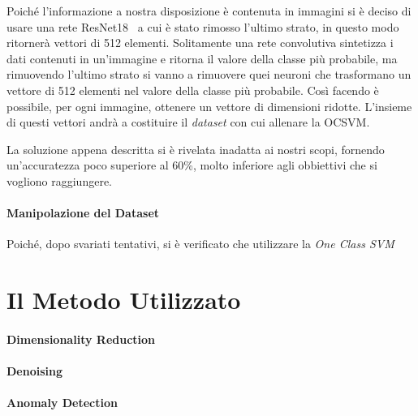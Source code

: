 Poiché l'informazione a nostra disposizione è contenuta in immagini si è deciso di usare una rete ResNet18~\cite{resnet} a cui è stato rimosso l'ultimo strato, in questo modo ritornerà vettori di 512 elementi.
Solitamente una rete convolutiva sintetizza i dati contenuti in un'immagine e ritorna il valore della classe più probabile, ma rimuovendo l'ultimo strato si vanno a rimuovere quei neuroni che trasformano un vettore di 512 elementi nel valore della classe più probabile. %
Così facendo è possibile, per ogni immagine, ottenere un vettore di dimensioni ridotte.
L'insieme di questi vettori andrà a costituire il \textit{dataset} con cui allenare la OCSVM.

La soluzione appena descritta si è rivelata inadatta ai nostri scopi, fornendo un'accuratezza poco superiore al 60\%, molto inferiore agli obbiettivi che si vogliono raggiungere.






\paragraph{Manipolazione del Dataset}
Poiché, dopo svariati tentativi, si è verificato che utilizzare la \textit{One Class SVM}











\clearpage
\section{Il Metodo Utilizzato}

\paragraph{Dimensionality Reduction}

\paragraph{Denoising}

\paragraph{Anomaly Detection}


